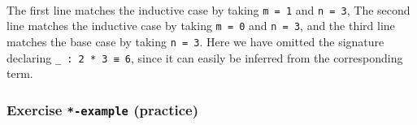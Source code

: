 \begin{fence}
\begin{code}%
\>[0]\AgdaFunction{\AgdaUnderscore{}}%
\>[120I]\AgdaSymbol{=}\<%
\\
\>[.][@{}l@{}]\<[120I]%
\>[2]\<%
\\
\>[2][@{}l@{\AgdaIndent{0}}]%
\>[4]\AgdaSpace{}%
\AgdaOperator{\AgdaFunction{*}}\AgdaSpace{}%
\<%
\\
%
\>[2]%
\>[9]\<%
\\
\>[2][@{}l@{\AgdaIndent{0}}]%
\>[4]\AgdaSpace{}%
\AgdaOperator{\AgdaFunction{+}}\AgdaSpace{}%
\AgdaSymbol{(}\AgdaSpace{}%
\AgdaOperator{\AgdaFunction{*}}\AgdaSpace{}%
\AgdaSymbol{)}\<%
\\
%
\>[2]%
\>[9]\<%
\\
\>[2][@{}l@{\AgdaIndent{0}}]%
\>[4]\AgdaSpace{}%
\AgdaOperator{\AgdaFunction{+}}\AgdaSpace{}%
\AgdaSymbol{(}\AgdaSpace{}%
\AgdaOperator{\AgdaFunction{+}}\AgdaSpace{}%
\AgdaSymbol{(}\AgdaSpace{}%
\AgdaOperator{\AgdaFunction{*}}\AgdaSpace{}%
\AgdaSymbol{))}\<%
\\
%
\>[2]%
\>[9]\<%
\\
\>[2][@{}l@{\AgdaIndent{0}}]%
\>[4]\AgdaSpace{}%
\AgdaOperator{\AgdaFunction{+}}\AgdaSpace{}%
\AgdaSymbol{(}\AgdaSpace{}%
\AgdaOperator{\AgdaFunction{+}}\AgdaSpace{}%
\AgdaSymbol{)}\<%
\\
%
\>[2]%
\>[9]\<%
\\
\>[2][@{}l@{\AgdaIndent{0}}]%
\>[4]\<%
\\
%
\>[2]\<%
\end{code}
\end{fence}

The first line matches the inductive case by taking \texttt{m\ =\ 1} and
\texttt{n\ =\ 3}, The second line matches the inductive case by taking
\texttt{m\ =\ 0} and \texttt{n\ =\ 3}, and the third line matches the
base case by taking \texttt{n\ =\ 3}. Here we have omitted the signature
declaring \texttt{\_\ :\ 2\ *\ 3\ ≡\ 6}, since it can easily be inferred
from the corresponding term.

\hypertarget{Naturals-times-example}{%
\subsubsection{\texorpdfstring{Exercise \texttt{*-example}
(practice)}{Exercise *-example (practice)}}\label{Naturals-times-example}}

